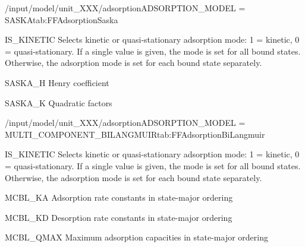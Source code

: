 \begin{condsubgroup}{/input/model/unit\_XXX/adsorption}{ADSORPTION\_MODEL = SASKA}{tab:FFAdsorptionSaska}
\begin{dataset}[type=int,range={$\{ 0,1 \}$},length={1 / \texttt{NTOTALBND}}]{IS\_KINETIC}
    Selects kinetic or quasi-stationary adsorption mode: 1 = kinetic, 0 = quasi-stationary.
    If a single value is given, the mode is set for all bound states.
    Otherwise, the adsorption mode is set for each bound state separately.
  \end{dataset}
  \begin{dataset}[unit=\si{\cubic\metre\of{MP}\per\cubic\metre\of{SP}\per\second}, type=double,range={$\mathds{R}$},length={\texttt{NCOMP}}]{SASKA\_H}
    Henry coefficient
  \end{dataset}
  \begin{dataset}[unit=\si{\raiseto{6}\metre\of{MP}\per\cubic\metre\of{SP}\per\mol\per\second}, type=double,range={$\mathds{R}$},length={$\texttt{NCOMP}^2$}]{SASKA\_K}
    Quadratic factors
  \end{dataset}
\end{condsubgroup}

\begin{condsubgroup}{/input/model/unit\_XXX/adsorption}{ADSORPTION\_MODEL = MULTI\_COMPONENT\_BILANGMUIR}{tab:FFAdsorptionBiLangmuir}
\begin{dataset}[type=int,range={$\{ 0,1 \}$},length={1 / \texttt{NTOTALBND}}]{IS\_KINETIC}
    Selects kinetic or quasi-stationary adsorption mode: 1 = kinetic, 0 = quasi-stationary.
    If a single value is given, the mode is set for all bound states.
    Otherwise, the adsorption mode is set for each bound state separately.
  \end{dataset}
  \begin{dataset}[unit=\si{\cubic\metre\of{MP}\per\mol\per\second}, type=double,range={$\geq 0$},length={$\texttt{NSTATES} \cdot \texttt{NCOMP}$}]{MCBL\_KA}
    Adsorption rate constants in state-major ordering
  \end{dataset}
  \begin{dataset}[unit=\si{\per\second}, type=double,range={$\geq 0$},length={$\texttt{NSTATES} \cdot \texttt{NCOMP}$}]{MCBL\_KD}
    Desorption rate constants in state-major ordering
  \end{dataset}
  \begin{dataset}[unit=\si{\mol\per\cubic\metre\of{SP}}, type=double,range={$> 0.0$},length={$\texttt{NSTATES} \cdot \texttt{NCOMP}$}]{MCBL\_QMAX}
    Maximum adsorption capacities in state-major ordering
  \end{dataset}
\end{condsubgroup}

